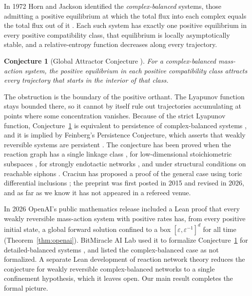 \documentclass[11pt]{article}
\theoremstyle{plain}
\newtheorem{conjecture}[theorem]{Conjecture}
\theoremstyle{definition}
\theoremstyle{remark}
\begin{document}
In 1972 Horn and Jackson identified the \emph{complex-balanced} systems, those admitting a positive equilibrium at which the total flux into each complex equals the total flux out of it \cite{HJ72}. Each such system has exactly one positive equilibrium in every positive compatibility class, that equilibrium is locally asymptotically stable, and a relative-entropy function decreases along every trajectory.

\begin{conjecture}[Global Attractor Conjecture \cite{Horn74,CDSS09}]\label{conj:gac}
For a complex-balanced mass-action system, the positive equilibrium in each positive compatibility class attracts every trajectory that starts in the interior of that class.
\end{conjecture}

The obstruction is the boundary of the positive orthant. The Lyapunov function stays bounded there, so it cannot by itself rule out trajectories accumulating at points where some concentration vanishes. Because of the strict Lyapunov function, Conjecture~\ref{conj:gac} is equivalent to persistence of complex-balanced systems \cite{GMS14}, and it is implied by Feinberg's Persistence Conjecture, which asserts that weakly reversible systems are persistent \cite{Feinberg87,AS10}. The conjecture has been proved when the reaction graph has a single linkage class \cite{Anderson11}, for low-dimensional stoichiometric subspaces \cite{AS10,Pantea12,CNP13}, for strongly endotactic networks \cite{GMS14}, and under structural conditions on reachable siphons \cite{Wiuf26}. Craciun has proposed a proof of the general case using toric differential inclusions \cite{Craciun15}; the preprint was first posted in 2015 and revised in 2026, and as far as we know it has not appeared in a refereed venue.

In 2026 OpenAI's public mathematics release \cite{OpenAIMath} included a Lean proof that every weakly reversible mass-action system with positive rates has, from every positive initial state, a global forward solution confined to a box $[\varepsilon, \varepsilon^{-1}]^d$ for all time (Theorem~\ref{thm:openai}). BitMiracle AI Lab used it to formalize Conjecture~\ref{conj:gac} for detailed-balanced systems \cite{BitMiracle26}, and listed the complex-balanced case as not formalized. A separate Lean development of reaction network theory \cite{CRNTLean} reduces the conjecture for weakly reversible complex-balanced networks to a single confinement hypothesis, which it leaves open. Our main result completes the formal picture.
\end{document}
